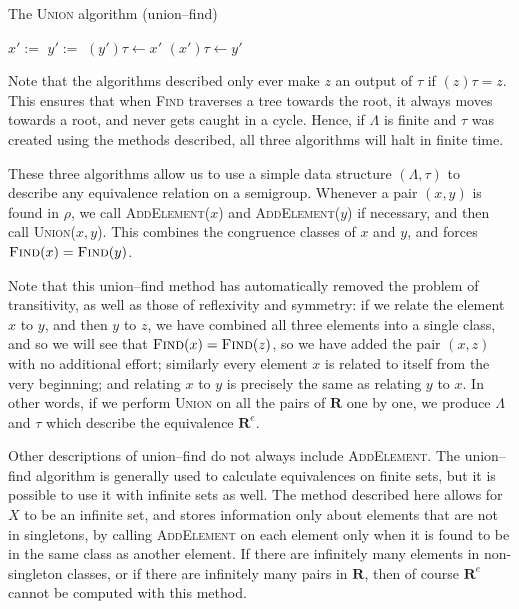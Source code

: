 \begin{algorithm}
\caption{The \textsc{Union} algorithm (union--find)}
\label{alg:uf-union}
  \begin{algorithmic}[1]
      \State $x' := $ 
      \State $y' := $ 
        \State $(y')\tau \gets x'$
        \State $(x')\tau \gets y'$
      \EndIf
    \EndProcedure
  \end{algorithmic}
\end{algorithm}

Note that the algorithms described only ever make $z$ an output of $\tau$ if
$(z)\tau = z$.  This ensures that when \textsc{Find} traverses a tree towards
the root, it always moves towards a root, and never gets caught in a cycle.
Hence, if $\Lambda$ is finite and $\tau$ was created using the methods
described, all three algorithms will halt in finite time.

These three algorithms allow us to use a simple data structure $(\Lambda, \tau)$ to describe any
equivalence relation on a semigroup.  Whenever a pair $(x,y)$ is found in
$\rho$, we call \textsc{AddElement($x$)} and \textsc{AddElement($y$)} if
necessary, and then call \textsc{Union($x,y$)}.
This combines the congruence classes of $x$ and $y$, and forces
$\textsc{Find}(x) = \textsc{Find}(y)$.

Note that this union--find method has automatically removed the problem of
transitivity, as well as those of reflexivity and symmetry: if we relate the
element $x$ to $y$, and then $y$ to $z$, we have combined all three elements
into a single class, and so we will see that
$\textsc{Find}(x) = \textsc{Find}(z)$, so we have added the pair $(x,z)$ with no
additional effort; similarly every element $x$ is related to itself from the
very beginning; and relating $x$ to $y$ is precisely the same as relating $y$ to
$x$.  In other words, if we perform \textsc{Union} on all the pairs of
$\mathbf{R}$ one by one, we produce $\Lambda$ and $\tau$ which describe the
equivalence $\mathbf{R}^e$.

Other descriptions of union--find do not always include \textsc{AddElement}.  The
union--find algorithm is generally used to calculate equivalences on finite sets,
but it is possible to use it with infinite sets as well.  The method described
here allows for $X$ to be an infinite set, and stores information only about
elements that are not in singletons, by calling \textsc{AddElement} on each
element only when it is found to be in the same class as another element.  If
there are infinitely many elements in non-singleton classes, or if there are
infinitely many pairs in $\mathbf{R}$, then of course $\mathbf{R}^e$ cannot be
computed with this method.


